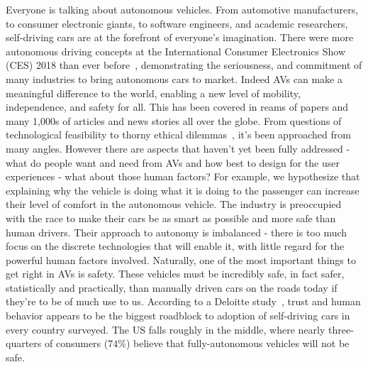 Everyone is talking about autonomous vehicles. 
From automotive manufacturers, to consumer electronic giants, to software engineers, and academic researchers, self-driving cars are at the forefront of everyone’s imagination. 
There were more autonomous driving concepts at the International Consumer Electronics Show (CES) 2018 than ever before~\cite{techcrunch_2018}, demonstrating the seriousness, and commitment of many industries to bring autonomous cars to market.
Indeed AVs can make a meaningful difference to the world, enabling a new level of mobility, independence, and safety for all. 
This has been covered in reams of papers and many 1,000s of articles and news stories all over the globe. 
From questions of technological feasibility to thorny ethical dilemmas~\cite{lin2016ethics}, it’s been approached from many angles.
However there are aspects that haven’t yet been fully addressed - what do people want and need from AVs and how best to design for the user experiences - what about those human factors?
For example, we hypothesize that explaining why the vehicle is doing what it is doing to the passenger can increase their level of comfort in the autonomous vehicle.
The industry is preoccupied with the race to make their cars be as smart as possible and more safe than human drivers.
Their approach to autonomy is imbalanced - there is too much focus on the discrete technologies that will enable it, with little regard for the powerful human factors involved. 
Naturally, one of the most important things to get right in AVs is safety. 
These vehicles must be incredibly safe, in fact safer, statistically and practically, than manually driven cars on the roads today if they’re to be of much use to us. 
According to a Deloitte study~\cite{deloitte}, trust and human behavior appears to be the biggest roadblock to adoption of self-driving cars in every country surveyed. 
The US falls roughly in the middle, where nearly three-quarters of consumers ($74\%$) believe that fully-autonomous vehicles will not be safe. 
